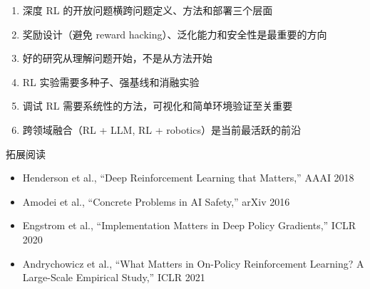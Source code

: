 \documentclass[a4paper]{article}
\begin{document}
\begin{enumerate}
    \item 深度 RL 的开放问题横跨问题定义、方法和部署三个层面
    \item 奖励设计（避免 reward hacking）、泛化能力和安全性是最重要的方向
    \item 好的研究从理解问题开始，不是从方法开始
    \item RL 实验需要多种子、强基线和消融实验
    \item 调试 RL 需要系统性的方法，可视化和简单环境验证至关重要
    \item 跨领域融合（RL + LLM, RL + robotics）是当前最活跃的前沿
\end{enumerate}

\begin{knowledgebox}{拓展阅读}
\begin{itemize}
    \item Henderson et al., ``Deep Reinforcement Learning that Matters,'' AAAI 2018
    \item Amodei et al., ``Concrete Problems in AI Safety,'' arXiv 2016
    \item Engstrom et al., ``Implementation Matters in Deep Policy Gradients,'' ICLR 2020
    \item Andrychowicz et al., ``What Matters in On-Policy Reinforcement Learning? A Large-Scale Empirical Study,'' ICLR 2021
\end{itemize}
\end{knowledgebox}
\end{document}
